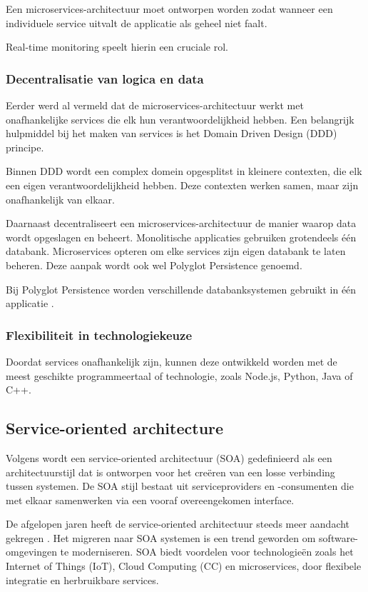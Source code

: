 Een microservices-architectuur moet ontworpen worden zodat wanneer een individuele service uitvalt de applicatie als geheel niet faalt.

Real-time monitoring speelt hierin een cruciale rol.

\subsubsection{Decentralisatie van logica en data}

Eerder werd al vermeld dat de microservices-architectuur werkt met onafhankelijke services die elk hun verantwoordelijkheid hebben. Een belangrijk hulpmiddel bij het maken van services is het Domain Driven Design (DDD) principe. 

Binnen DDD wordt een complex domein opgesplitst in kleinere contexten, die elk een eigen verantwoordelijkheid hebben. Deze contexten werken samen, maar zijn onafhankelijk van elkaar.

Daarnaast decentraliseert een microservices-architectuur de manier waarop data wordt opgeslagen en beheert. Monolitische applicaties gebruiken grotendeels één databank. Microservices opteren om elke services zijn eigen databank te laten beheren. Deze aanpak wordt ook wel Polyglot Persistence genoemd.

Bij Polyglot Persistence worden verschillende databanksystemen gebruikt in één applicatie \autocite{RoyHubara2022}.

\subsubsection{Flexibiliteit in technologiekeuze}

Doordat services onafhankelijk zijn, kunnen deze ontwikkeld worden met de meest geschikte programmeertaal of technologie, zoals Node.js, Python, Java of C++.

\subsection{Service-oriented architecture}
\label{sec:soa}

Volgens \textcite{Rojas2021} wordt een service-oriented architectuur (SOA) gedefinieerd als een architectuurstijl dat is ontworpen voor het creëren van een losse verbinding tussen systemen. De SOA stijl bestaat uit serviceproviders en -consumenten die met elkaar samenwerken via een vooraf overeengekomen interface. 

De afgelopen jaren heeft de service-oriented architectuur steeds meer aandacht gekregen \autocite{Niknejad2020}. Het migreren naar SOA systemen is een trend geworden om software-omgevingen te moderniseren. SOA biedt voordelen voor technologieën zoals het Internet of Things (IoT), Cloud Computing (CC) en microservices, door flexibele integratie en herbruikbare services.

